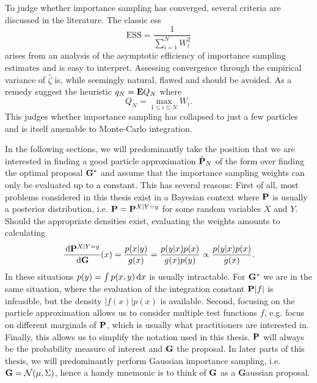 To judge whether importance sampling has converged, several criteria are discussed in the literature. The classic \gls{ess}\citep{Kong1994Sequential} 
$$
\text{ESS} = \frac{1}{\sum_{i = 1}^N W^{2}_{i}}
$$
arises from an analysis of the asymptotic efficiency of importance sampling estimates and is easy to interpret. Assessing convergence through the empirical variance of $\hat \zeta$ is, while seemingly natural, flawed \citep{Chatterjee2018Sample}  and should be avoided. As a remedy \citep{Chatterjee2018Sample} suggest the heuristic $q_{N} = \E Q_{N}$ where
$$
Q_{N} = \max_{1\leq i\leq N} W_{i}.
$$
This judges whether importance sampling has collapsed to just a few particles and is itself amenable to Monte-Carlo integration.

In the following sections, we will predominantly take the position that we are interested in finding a good particle approximation $\hat\P_{N}$ of the form  over finding the optimal proposal $\G^{\ast}$  and assume that the importance sampling weights can only be evaluated up to a constant. 
This has several reasons: First of all, most problems considered in this thesis exist in a Bayesian context where $\P$ is usually a posterior distribution, i.e. $\P = \P^{X|Y=y}$ for some random variables $X$ and $Y$. Should the appropriate densities exist, evaluating the weights amounts to calculating 
$$
\rnd{\P^{X| Y= y}}{\G}(x) = \frac{p(x|y)}{g(x)} = \frac{p(y|x)p(x)}{g(x)p(y)} \propto \frac{p(y|x)p(x)}{g(x)}.
$$
In these situations $p(y) = \int p(x,y)\d x$ is usually intractable. For $\G^{\ast}$ we are in the same situation, where the evaluation of the integration constant $\P \lvert f \rvert$ is infeasible, but the density $\lvert f(x)\rvert p(x)$ is available.
Second, focusing on the particle approximation allows us to consider multiple test functions $f$, e.g. focus on different marginals of $\P$, which is usually what practitioners are interested in. 
Finally, this allows us to simplify the notation used in this thesis. $\P$ will always be the probability measure of interest and $\G$ the proposal. In later parts of this thesis, we will predominantly perform Gaussian importance sampling, i.e. $\G = \mathcal N(\mu, \Sigma)$, hence a handy mnemonic is to think of $\G$ as a \textbf{G}aussian proposal.

